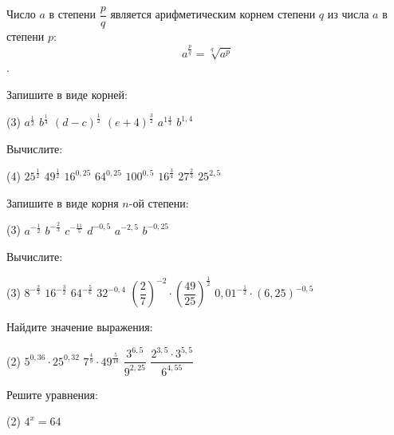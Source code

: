 \begin{class}[number=3]
	\begin{definit}
		Число \(a\) в степени \(\dfrac{p}{q}\) является арифметическим корнем степени \(q\) из числа \(a\) в степени \(p\): \[ a^{\frac{p}{q}}=\sqrt[q]{a^p} \].
	\end{definit}
	\begin{listofex}
		\item Запишите в виде корней:
		\begin{tasks}(3)
			\task \( a^{\tfrac{1}{2}} \)
			\task \( b^{\tfrac{1}{4}} \)
			\task \( (d-c)^{\tfrac{1}{2}} \)
			\task \( (e+4)^{\tfrac{3}{2}} \)
			\task \( a^{1\tfrac{4}{3}} \)
			\task \( b^{1,4} \)
		\end{tasks}
		\item Вычислите:
		\begin{tasks}(4)
			\task \( 25^{\tfrac{1}{2}} \)
			\task \( 49^{\tfrac{1}{2}} \)
			\task \( 16^{0,25} \)
			\task \( 64^{0,25} \)
			\task \( 100^{0,5} \)
			\task \( 16^{\tfrac{3}{4}} \)
			\task \( 27^{\tfrac{2}{3}} \)
			\task \( 25^{2,5} \)
		\end{tasks}
		\item Запишите в виде корня \(n\)-ой степени:
		\begin{tasks}(3)
			\task \( a^{-\tfrac{1}{2}} \)
			\task \( b^{-\tfrac{2}{3}} \)
			\task \( c^{-\tfrac{11}{5}} \)
			\task \( d^{-0,5} \)
			\task \( a^{-2,5} \)
			\task \( b^{-0,25} \)
		\end{tasks}
		\item Вычислите:
		\begin{tasks}(3)
			\task \( 8^{-\tfrac{2}{3}} \)
			\task \( 16^{-\tfrac{3}{2}} \)
			\task \( 64^{-\tfrac{5}{6}} \)
			\task \( 32^{-0,4} \)
			\task \( \left( \dfrac{2}{7}\right)^{-2} \cdot \left( \dfrac{49}{25} \right)^{\tfrac{1}{2}} \)
			\task \( 0,01^{-\tfrac{1}{2}} \cdot (6,25)^{-0,5} \)
		\end{tasks}
		\item Найдите значение выражения:
		\begin{tasks}(2)
			\task \( 5^{0,36} \cdot 25^{0,32} \)
			\task \( 7^{\tfrac{4}{9}} \cdot 49^{\tfrac{5}{18}} \)
			\task \( \dfrac{3^{6,5}}{9^{2,25}} \)
			\task \( \dfrac{2^{3,5}\cdot3^{5,5}}{6^{4,55}} \)
		\end{tasks}
		\item Решите уравнения:
		\begin{tasks}(2)
			\task \( 4^x=64 \)

\end{tasks}
\end{listofex}
\end{class}
